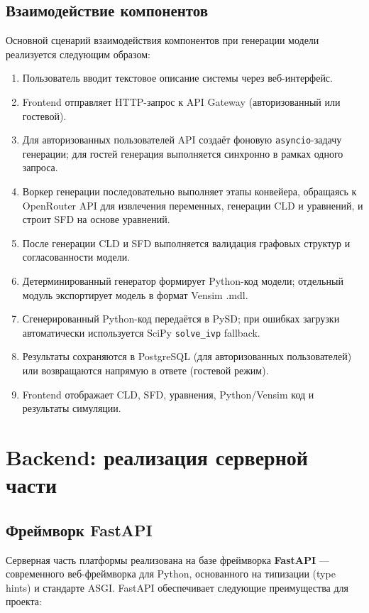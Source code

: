 \subsection{Взаимодействие компонентов}

Основной сценарий взаимодействия компонентов при генерации модели реализуется следующим образом:

\begin{enumerate}
    \item Пользователь вводит текстовое описание системы через веб-интерфейс.
    \item Frontend отправляет HTTP-запрос к API Gateway (авторизованный или гостевой).
    \item Для авторизованных пользователей API создаёт фоновую \texttt{asyncio}-задачу генерации; для гостей генерация выполняется синхронно в рамках одного запроса.
    \item Воркер генерации последовательно выполняет этапы конвейера, обращаясь к OpenRouter API для извлечения переменных, генерации CLD и уравнений, и строит SFD на основе уравнений.
    \item После генерации CLD и SFD выполняется валидация графовых структур и согласованности модели.
    \item Детерминированный генератор формирует Python-код модели; отдельный модуль экспортирует модель в формат Vensim .mdl.
    \item Сгенерированный Python-код передаётся в PySD; при ошибках загрузки автоматически используется SciPy \texttt{solve\_ivp} fallback.
    \item Результаты сохраняются в PostgreSQL (для авторизованных пользователей) или возвращаются напрямую в ответе (гостевой режим).
    \item Frontend отображает CLD, SFD, уравнения, Python/Vensim код и результаты симуляции.
\end{enumerate}


\section{Backend: реализация серверной части}

\subsection{Фреймворк FastAPI}

Серверная часть платформы реализована на базе фреймворка \textbf{FastAPI} \cite{fastapi2024} --- современного веб-фреймворка для Python, основанного на типизации (type hints) и стандарте ASGI. FastAPI обеспечивает следующие преимущества для проекта:

